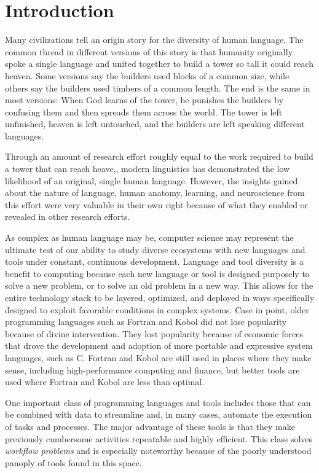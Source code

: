 \chapter{Introduction} \label{ch:introduction}

Many civilizations tell an origin story for the diversity of human language. The
common thread in different versions of this story is that humanity
originally spoke a single language and united together to build a tower so tall
it could reach heaven. Some versions say the builders used blocks of
a common size, while others say the builders used timbers of a common
length. The end is the same in most versions: When God learns of the
tower, he punishes the builders by confusing them and then spreads them across
the world. The tower is left unfinished, heaven is left untouched, and the
builders are left speaking different languages.

Through an amount of research effort roughly equal to the work required
to build a tower that can reach heave,, modern linguistics has demonstrated the
low likelihood of an original, single human language. However, the insights gained
about the nature of language, human anatomy, learning, and neuroscience from
this effort were very valuable in their own right because of what they enabled or
revealed in other research efforts.

As complex as human language may be, computer science may represent the ultimate
test of our ability to study diverse ecosystems with new languages and tools
under constant, continuous development. Language and tool diversity is a
benefit to computing because each new language or tool is designed purposely to
solve a new problem, or to solve an old problem in a new way. This allows for
the entire technology stack to  be layered, optimized, and deployed in ways
specifically designed to exploit favorable conditions in complex systems. Case
in point, older programming languages such as Fortran and Kobol did not lose
popularity because of divine intervention. They lost popularity because of
economic forces that drove the development and adoption of more portable and
expressive system languages, such as C. Fortran and Kobol are still used in
places where they make sense, including high-performance computing and finance,
but better tools are used where Fortran and Kobol are less than optimal.

One important class of programming languages and tools includes those that
can be combined with data to streamline and, in many cases, automate the
execution of tasks and processes. The major advantage of these tools is that
they make previously cumbersome activities repeatable and highly efficient.
This class solves \textit{workflow problems} and is especially noteworthy
because of the poorly understood panoply of tools found in this space.

